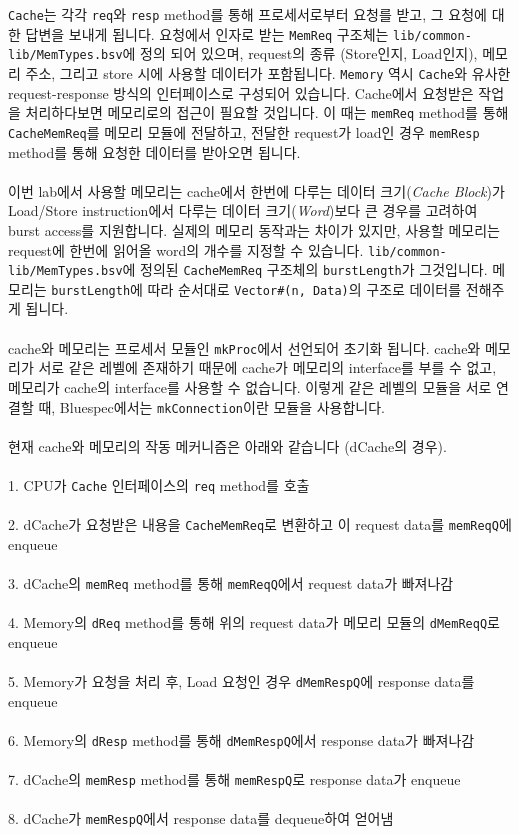 \documentclass{article}
\begin{document}
\noindent\texttt{Cache}는 각각 \texttt{req}와 \texttt{resp} method를 통해 프로세서로부터 요청를 받고, 그 요청에 대한 답변을
보내게 됩니다. 요청에서 인자로 받는 \texttt{MemReq} 구조체는 \texttt{lib/common-lib/MemTypes.bsv}에 정의 되어 있으며,
request의 종류 (Store인지, Load인지), 메모리 주소, 그리고 store 시에 사용할 데이터가 포함됩니다.
\texttt{Memory} 역시 \texttt{Cache}와 유사한 request-response 방식의 인터페이스로 구성되어 있습니다.
Cache에서 요청받은 작업을 처리하다보면 메모리로의 접근이 필요할 것입니다.
이 때는 \texttt{memReq} method를 통해 \texttt{CacheMemReq}를 메모리 모듈에 전달하고, 
전달한 request가 load인 경우 \texttt{memResp} method를 통해 요청한 데이터를 받아오면 됩니다. 
\\\\
이번 lab에서 사용할 메모리는 cache에서 한번에 다루는 데이터 크기(\textit{Cache Block})가
Load/Store instruction에서 다루는 데이터 크기(\textit{Word})보다 큰 경우를 고려하여 burst access를 지원합니다.
실제의 메모리 동작과는 차이가 있지만, 사용할 메모리는 request에 한번에 읽어올 word의 개수를 지정할 수 있습니다.
\texttt{lib/common-lib/MemTypes.bsv}에 정의된 \texttt{CacheMemReq} 구조체의 \texttt{burstLength}가 그것입니다.
메모리는 \texttt{burstLength}에 따라 순서대로 \texttt{Vector\#(n, Data)}의 구조로 데이터를 전해주게 됩니다.
\\\\
cache와 메모리는 프로세서 모듈인 \texttt{mkProc}에서 선언되어 초기화 됩니다.
cache와 메모리가 서로 같은 레벨에 존재하기 때문에 cache가 메모리의 interface를 부를 수 없고,
메모리가 cache의 interface를 사용할 수 없습니다. 이렇게 같은 레벨의 모듈을 서로 연결할 때, Bluespec에서는 \texttt{mkConnection}이란 모듈을 사용합니다. 
\\\\
현재 cache와 메모리의 작동 메커니즘은 아래와 같습니다 (dCache의 경우).
\\\\
1. CPU가 \texttt{Cache} 인터페이스의 \texttt{req} method를 호출
\\\\
2. dCache가 요청받은 내용을 \texttt{CacheMemReq}로 변환하고 이 request data를 \texttt{memReqQ}에 enqueue
\\\\
3. dCache의 \texttt{memReq} method를 통해 \texttt{memReqQ}에서 request data가 빠져나감
\\\\
4. Memory의 \texttt{dReq} method를 통해 위의 request data가 메모리 모듈의 \texttt{dMemReqQ}로 enqueue
\\\\
5. Memory가 요청을 처리 후, Load 요청인 경우 \texttt{dMemRespQ}에 response data를 enqueue
\\\\
6. Memory의 \texttt{dResp} method를 통해 \texttt{dMemRespQ}에서 response data가 빠져나감
\\\\
7. dCache의 \texttt{memResp} method를 통해 \texttt{memRespQ}로 response data가 enqueue
\\\\
8. dCache가 \texttt{memRespQ}에서 response data를 dequeue하여 얻어냄
\\\\
\end{document}
